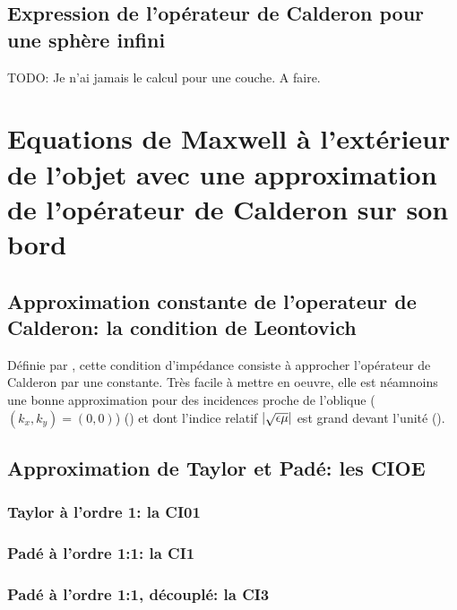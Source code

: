     \subsection{Expression de l'opérateur de Calderon pour une sphère infini}

        \begin{REM}
            TODO: Je n'ai jamais le calcul pour une couche. A faire.
        \end{REM}

\section{Equations de Maxwell à l'extérieur de l'objet avec une approximation de l'opérateur de Calderon sur son bord}

    \subsection{Approximation constante de l'operateur de Calderon: la condition de Leontovich}
        
        Définie par \cite{leontovich_investigations_1948}, cette condition d'impédance consiste à approcher l'opérateur de Calderon par une constante.
        Très facile à mettre en oeuvre, elle est néamnoins une bonne approximation pour des incidences proche de l'oblique (\((k_x,k_y)=(0,0)\)) (\cite{leontovich_investigations_1948}) et dont l'indice relatif \(|\sqrt{\epsilon\mu}|\) est grand devant l'unité (\cite[par.~3, p.421-422]{senior_impedance_1960}).

    \subsection{Approximation de Taylor et Padé: les CIOE}

        \subsubsection{Taylor à l'ordre 1: la CI01}

        \subsubsection{Padé à l'ordre 1:1: la CI1}

        \subsubsection{Padé à l'ordre 1:1, découplé: la CI3}

